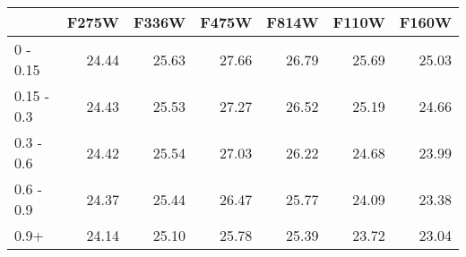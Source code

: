 \begin{tabular}{lrrrrrr}
\toprule
{} &  F275W &  F336W &  F475W &  F814W &  F110W &  F160W \\
\midrule
0 - 0.15   &  24.44 &  25.63 &  27.66 &  26.79 &  25.69 &  25.03 \\
0.15 - 0.3 &  24.43 &  25.53 &  27.27 &  26.52 &  25.19 &  24.66 \\
0.3 - 0.6  &  24.42 &  25.54 &  27.03 &  26.22 &  24.68 &  23.99 \\
0.6 - 0.9  &  24.37 &  25.44 &  26.47 &  25.77 &  24.09 &  23.38 \\
0.9+       &  24.14 &  25.10 &  25.78 &  25.39 &  23.72 &  23.04 \\
\bottomrule
\end{tabular}
